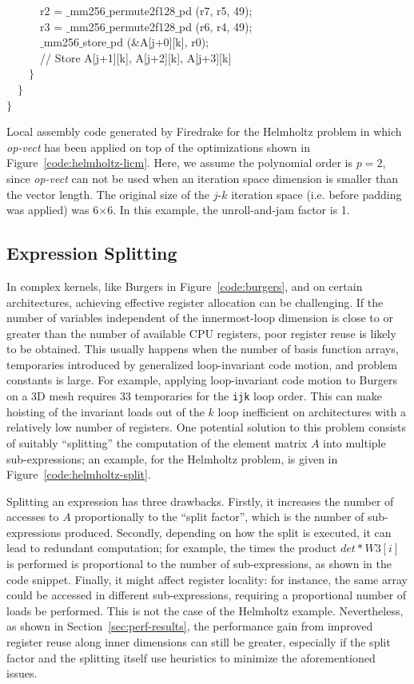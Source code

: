 \documentclass[conference]{IEEEtran}
\begin{document}
\begin{algorithm}[t]
~~~~~~r2 = $\_$mm256$\_$permute2f128$\_$pd (r7, r5, 49);\\
~~~~~~r3 = $\_$mm256$\_$permute2f128$\_$pd (r6, r4, 49);\\
~~~~~~$\_$mm256$\_$store$\_$pd ($\&$A[j+0][k], r0);\\
~~~~~~// Store A[j+1][k], A[j+2][k], A[j+3][k]\\
~~~~$\rbrace$\\
~~$\rbrace$\\
$\rbrace$
\caption{Local assembly code generated by Firedrake for the Helmholtz problem in which \emph{op-vect} has been applied on top of the optimizations shown in Figure~\ref{code:helmholtz-licm}. Here, we assume the polynomial order is $p=2$, since \emph{op-vect} can not be used when an iteration space dimension is smaller than the vector length. The original size of the $j$-$k$ iteration space (i.e. before padding was applied) was 6$\times$6. In this example, the unroll-and-jam factor is 1.}
\label{code:helmholtz-opvect}
\end{algorithm}



\subsection{Expression Splitting}
\label{sec:expr-split}
In complex kernels, like Burgers in Figure~\ref{code:burgers}, and on certain architectures, achieving effective register allocation can be challenging. If the number of variables independent of the innermost-loop dimension is close to or greater than the number of available CPU registers, poor register reuse is likely to be obtained. This usually happens when the number of basis function arrays, temporaries introduced by generalized loop-invariant code motion, and problem constants is large. For example, applying loop-invariant code motion to Burgers on a 3D mesh requires 33 temporaries for the \texttt{ijk} loop order. This can make hoisting of the invariant loads out of the $k$ loop inefficient on architectures with a relatively low number of registers. One potential solution to this problem consists of suitably ``splitting'' the computation of the element matrix $A$ into multiple sub-expressions; an example, for the Helmholtz problem, is given in Figure~\ref{code:helmholtz-split}. 

Splitting an expression has three drawbacks. Firstly, it increases the number of accesses to $A$ proportionally to the ``split factor'', which is the number of sub-expressions produced. Secondly, depending on how the split is executed, it can lead to redundant computation; for example, the times the product $det*W3[i]$ is performed is proportional to the number of sub-expressions, as shown in the code snippet. Finally, it might affect register locality: for instance, the same array could be accessed in different sub-expressions, requiring a proportional number of loads be performed. This is not the case of the Helmholtz example. Nevertheless, as shown in Section~\ref{sec:perf-results}, the performance gain from improved register reuse along inner dimensions can still be greater, especially if the split factor and the splitting itself use heuristics to minimize the aforementioned issues.
\end{document}
